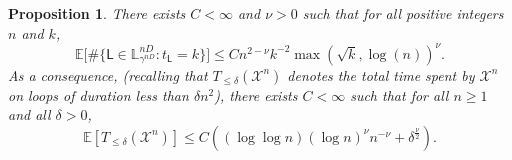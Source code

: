 \documentclass[11pt]{article}
\newtheorem{proposition}[theorem]{Proposition}
\begin{document}
\begin{proposition}
    \label{prop:vol2}
    There exists $C<\infty$ and $\nu>0$ such that for all positive integers $n$ and $k$,
    \[
    \mathbb{E}\Big[ \#   \{   \mathsf{L}\in \mathbb{L}^{nD}_{\gamma^{nD}}: t_\mathsf{L}=k \}  \Big]
    \leq C n^{2-\nu}   k^{-2}
    \max(\sqrt{k},   \log(n))^\nu .
    \]
    As a consequence, (recalling that $T_{\leq \delta} (\mathcal{X}^n)$ denotes the total time spent by $\mathcal{X}^n$ on loops of duration less than $\delta n^2$), there exists $C<\infty$ such that for all $n\geq 1$ and all $\delta>0$,
    \begin{equation}
    \label{eq:temp:Ebound}
    \mathbb{E}[T_{\leq \delta}(\mathcal{X}^n)]
    \leq C ((\log\log n) (\log n)^\nu n^{-\nu}+ \delta^{\frac{\nu}{2}}).
    \end{equation}
\end{proposition}
\end{document}
